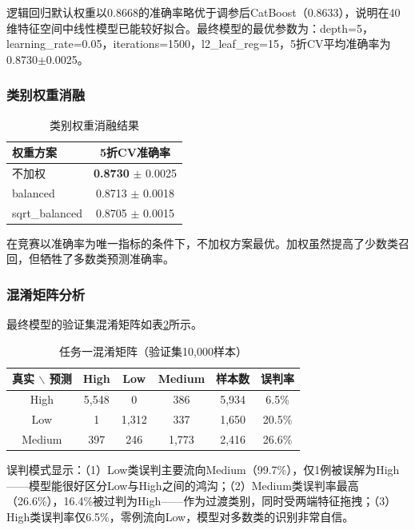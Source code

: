 逻辑回归默认权重以0.8668的准确率略优于调参后CatBoost（0.8633），说明在40维特征空间中线性模型已能较好拟合。最终模型的最优参数为：depth=5，learning\_rate=0.05，iterations=1500，l2\_leaf\_reg=15，5折CV平均准确率为0.8730$\pm$0.0025。

\subsubsection{类别权重消融}

\begin{table}[H]
\centering
\caption{类别权重消融结果}
\label{tab:t1_weight}
\begin{tabular}{lc}
\toprule
\textbf{权重方案} & \textbf{5折CV准确率} \\
\midrule
不加权 & \textbf{0.8730} $\pm$ 0.0025 \\
balanced & 0.8713 $\pm$ 0.0018 \\
sqrt\_balanced & 0.8705 $\pm$ 0.0015 \\
\bottomrule
\end{tabular}
\end{table}

在竞赛以准确率为唯一指标的条件下，不加权方案最优。加权虽然提高了少数类召回，但牺牲了多数类预测准确率。

\subsubsection{混淆矩阵分析}

最终模型的验证集混淆矩阵如表\ref{tab:t1_conf}所示。

\begin{table}[H]
\centering
\caption{任务一混淆矩阵（验证集10,000样本）}
\label{tab:t1_conf}
\begin{tabular}{cccccc}
\toprule
\textbf{真实 $\backslash$ 预测} & \textbf{High} & \textbf{Low} & \textbf{Medium} & \textbf{样本数} & \textbf{误判率} \\
\midrule
High & 5,548 & 0 & 386 & 5,934 & 6.5\% \\
Low & 1 & 1,312 & 337 & 1,650 & 20.5\% \\
Medium & 397 & 246 & 1,773 & 2,416 & 26.6\% \\
\bottomrule
\end{tabular}
\end{table}

误判模式显示：（1）Low类误判主要流向Medium（99.7\%），仅1例被误解为High——模型能很好区分Low与High之间的鸿沟；（2）Medium类误判率最高（26.6\%），16.4\%被过判为High——作为过渡类别，同时受两端特征拖拽；（3）High类误判率仅6.5\%，零例流向Low，模型对多数类的识别非常自信。

